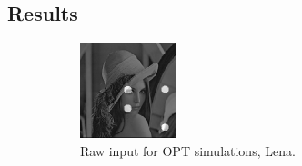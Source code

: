 \subsection{}

\subsection{Results}

\begin{figure}
  \centering
  \hfill
  \begin{subfigure}[t]{0.3\textwidth}
    \includegraphics[width=\textwidth]{Chapters/flopt/Figs/PDF/results/helix/raw_input}
    \caption{Raw input for OPT simulations, Lena.}
    \label{fig:raw_input}
  \end{subfigure}\hfill
  \begin{subfigure}[t]{0.3\textwidth}

\end{subfigure}
\end{figure}

